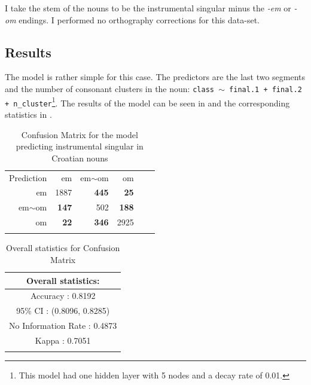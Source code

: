 I take the stem of the nouns to be the instrumental singular minus the \textit{-em} or \textit{-om} endings. I performed no orthography corrections for this data-set.

\subsection{Results}

The model is rather simple for this case. The predictors are the last two segments and the number of consonant clusters in the noun: \texttt{class $\sim$ final.1 + final.2 + n\_cluster}\footnote{This model had one hidden layer with 5 nodes and a decay rate of 0.01.}. The results of the model can be seen in  and the corresponding statistics in .

\begin{table}
  \centering
  \begin{tabular}{rrrrrr}
    \lsptoprule
    \multicolumn{4}{c}{Reference}                           \\
    \midrule
    Prediction & em           & em$\sim$om   & om           \\
    em         & 1887         & \textbf{445} & \textbf{25}  \\
    em$\sim$om & \textbf{147} & 502          & \textbf{188} \\
    om         & \textbf{22}  & \textbf{346} & 2925         \\
    \lspbottomrule
  \end{tabular}
  \caption{Confusion Matrix for the model predicting instrumental singular in Croatian nouns}\label{tab:ins-cro}
\end{table}

\begin{table}
  \centering
  \begin{tabular}{c}
    \lsptoprule
    Overall statistics:          \\
    \midrule
    Accuracy : 0.8192            \\
    95\% CI : (0.8096, 0.8285)   \\
    No Information Rate : 0.4873 \\
    Kappa : 0.7051               \\
    \lspbottomrule
  \end{tabular}
  \caption{Overall statistics for Confusion Matrix }\label{tab:ins-cro-stats}
\end{table}

